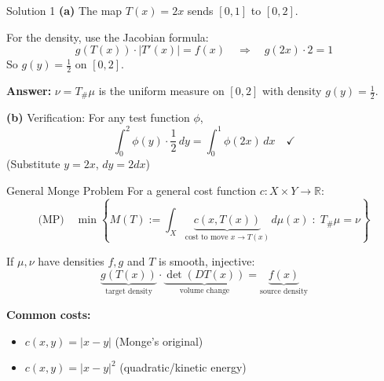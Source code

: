 \documentclass[aspectratio=169]{beamer}
\newcommand{\R}{\mathbb{R}}
\begin{document}
\begin{frame}{Solution 1}
\textbf{(a)} The map $T(x) = 2x$ sends $[0,1]$ to $[0,2]$.

For the density, use the Jacobian formula:
\[
g(T(x)) \cdot |T'(x)| = f(x) \quad \Rightarrow \quad g(2x) \cdot 2 = 1
\]
So $g(y) = \frac{1}{2}$ on $[0,2]$.

\vspace{0.3cm}
\textbf{Answer:} $\nu = T_\#\mu$ is the uniform measure on $[0,2]$ with density $g(y) = \frac{1}{2}$.

\vspace{0.5cm}
\textbf{(b)} Verification: For any test function $\phi$,
\[
\int_0^2 \phi(y) \cdot \frac{1}{2}\,dy = \int_0^1 \phi(2x)\,dx \quad \checkmark
\]
(Substitute $y = 2x$, $dy = 2dx$)
\end{frame}

\begin{frame}{General Monge Problem}
For a general cost function $c: X \times Y \to \R$:
\[
\text{(MP)} \quad \min \left\{ M(T) := \int_X \underbrace{c(x, T(x))}_{\text{cost to move } x \to T(x)} \, d\mu(x) \;:\; T_\#\mu = \nu \right\}
\]

\vspace{0.3cm}
If $\mu, \nu$ have densities $f, g$ and $T$ is smooth, injective:
\[
\underbrace{g(T(x))}_{\text{target density}} \cdot \underbrace{\det(DT(x))}_{\text{volume change}} = \underbrace{f(x)}_{\text{source density}}
\]

\vspace{0.3cm}
\textbf{Common costs:}
\begin{itemize}
    \item $c(x,y) = |x-y|$ \quad (Monge's original)
    \item $c(x,y) = |x-y|^2$ \quad (quadratic/kinetic energy)
\end{itemize}
\end{frame}
\end{document}
